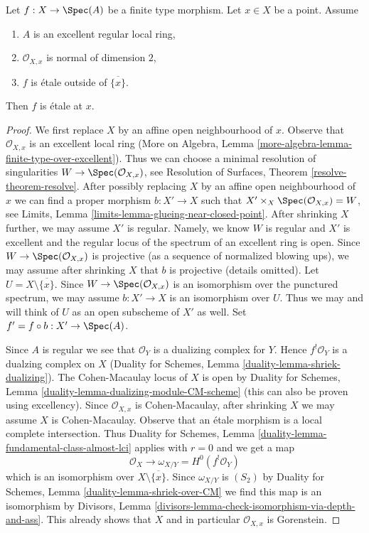 \begin{lemma}
\label{lemma-key-purity-ramification}
Let $f : X \to \Spec(A)$ be a finite type morphism.
Let $x \in X$ be a point. Assume
\begin{enumerate}
\item $A$ is an excellent regular local ring,
\item $\mathcal{O}_{X, x}$ is normal of dimension $2$,
\item $f$ is \'etale outside of $\overline{\{x\}}$.
\end{enumerate}
Then $f$ is \'etale at $x$.
\end{lemma}

\begin{proof}
We first replace $X$ by an affine open neighbourhood of $x$.
Observe that $\mathcal{O}_{X, x}$ is an excellent local ring
(More on Algebra, Lemma \ref{more-algebra-lemma-finite-type-over-excellent}).
Thus we can choose a minimal resolution of singularities
$W \to \Spec(\mathcal{O}_{X, x})$, see
Resolution of Surfaces, Theorem \ref{resolve-theorem-resolve}.
After possibly replacing $X$ by an affine open neighbourhood of $x$
we can find a proper morphism $b : X' \to X$ such that
$X' \times_X \Spec(\mathcal{O}_{X, x}) = W$, see
Limits, Lemma \ref{limits-lemma-glueing-near-closed-point}.
After shrinking $X$ further, we may assume $X'$ is regular.
Namely, we know $W$ is regular and $X'$ is excellent
and the regular locus of the spectrum of an excellent ring is open.
Since $W \to \Spec(\mathcal{O}_{X, x})$ is projective
(as a sequence of normalized blowing ups), we may assume
after shrinking $X$ that $b$ is projective (details omitted).
Let $U = X \setminus \overline{\{x\}}$.
Since $W \to \Spec(\mathcal{O}_{X, x})$ is an isomorphism over the
punctured spectrum, we may assume $b : X' \to X$ is an isomorphism over $U$.
Thus we may and will think of $U$ as an open subscheme of $X'$ as well.
Set $f' = f \circ b : X' \to \Spec(A)$.

\medskip\noindent
Since $A$ is regular we see that $\mathcal{O}_Y$ is a dualizing complex for $Y$.
Hence $f^!\mathcal{O}_Y$ is a dualzing complex on $X$
(Duality for Schemes, Lemma \ref{duality-lemma-shriek-dualizing}).
The Cohen-Macaulay locus of $X$ is open by
Duality for Schemes, Lemma \ref{duality-lemma-dualizing-module-CM-scheme}
(this can also be proven using excellency).
Since $\mathcal{O}_{X, x}$ is Cohen-Macaulay, after shrinking
$X$ we may assume $X$ is Cohen-Macaulay.
Observe that an \'etale morphism is a local complete intersection.
Thus
Duality for Schemes, Lemma \ref{duality-lemma-fundamental-class-almost-lci}
applies with $r = 0$ and we get a map
$$
\mathcal{O}_X \longrightarrow \omega_{X/Y} = H^0(f^!\mathcal{O}_Y)
$$
which is an isomorphism over $X \setminus \overline{\{x\}}$.
Since $\omega_{X/Y}$ is $(S_2)$ by
Duality for Schemes, Lemma \ref{duality-lemma-shriek-over-CM}
we find this map is an isomorphism by
Divisors, Lemma \ref{divisors-lemma-check-isomorphism-via-depth-and-ass}.
This already shows that $X$ and in particular $\mathcal{O}_{X, x}$ is
Gorenstein.


\end{proof}
